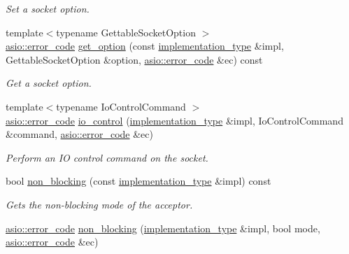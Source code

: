 \begin{DoxyCompactItemize}
\begin{DoxyCompactList}\small\item\em Set a socket option. \end{DoxyCompactList}\item 
{\footnotesize template$<$typename Gettable\+Socket\+Option $>$ }\\\hyperlink{classasio_1_1error__code}{asio\+::error\+\_\+code} \hyperlink{classasio_1_1socket__acceptor__service_a8646863fe555770c5d3a295d6263bf95}{get\+\_\+option} (const \hyperlink{classasio_1_1socket__acceptor__service_ae91b355a38c59424f68df71fcd9fffb8}{implementation\+\_\+type} \&impl, Gettable\+Socket\+Option \&option, \hyperlink{classasio_1_1error__code}{asio\+::error\+\_\+code} \&ec) const 
\begin{DoxyCompactList}\small\item\em Get a socket option. \end{DoxyCompactList}\item 
{\footnotesize template$<$typename Io\+Control\+Command $>$ }\\\hyperlink{classasio_1_1error__code}{asio\+::error\+\_\+code} \hyperlink{classasio_1_1socket__acceptor__service_a31ffba8fdfb6ffa47530088e52ce1147}{io\+\_\+control} (\hyperlink{classasio_1_1socket__acceptor__service_ae91b355a38c59424f68df71fcd9fffb8}{implementation\+\_\+type} \&impl, Io\+Control\+Command \&command, \hyperlink{classasio_1_1error__code}{asio\+::error\+\_\+code} \&ec)
\begin{DoxyCompactList}\small\item\em Perform an I\+O control command on the socket. \end{DoxyCompactList}\item 
bool \hyperlink{classasio_1_1socket__acceptor__service_a86ba38fd2ff9247f3bb390c5252f7ab3}{non\+\_\+blocking} (const \hyperlink{classasio_1_1socket__acceptor__service_ae91b355a38c59424f68df71fcd9fffb8}{implementation\+\_\+type} \&impl) const 
\begin{DoxyCompactList}\small\item\em Gets the non-\/blocking mode of the acceptor. \end{DoxyCompactList}\item 
\hyperlink{classasio_1_1error__code}{asio\+::error\+\_\+code} \hyperlink{classasio_1_1socket__acceptor__service_ac9ca84496355fe613017a9ecb03be5d9}{non\+\_\+blocking} (\hyperlink{classasio_1_1socket__acceptor__service_ae91b355a38c59424f68df71fcd9fffb8}{implementation\+\_\+type} \&impl, bool mode, \hyperlink{classasio_1_1error__code}{asio\+::error\+\_\+code} \&ec)

\end{DoxyCompactItemize}

